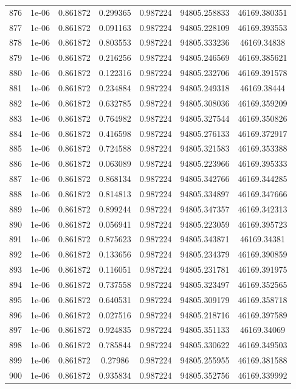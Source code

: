 \begin{table}
\begin{tabular*}{\linewidth}{c|c|c|c|c|c|c}
876 & 1e-06 & 0.861872 & 0.299365 & 0.987224 & 94805.258833 & 46169.380351\\
877 & 1e-06 & 0.861872 & 0.091163 & 0.987224 & 94805.228109 & 46169.393553\\
878 & 1e-06 & 0.861872 & 0.803553 & 0.987224 & 94805.333236 & 46169.34838\\
879 & 1e-06 & 0.861872 & 0.216256 & 0.987224 & 94805.246569 & 46169.385621\\
880 & 1e-06 & 0.861872 & 0.122316 & 0.987224 & 94805.232706 & 46169.391578\\
881 & 1e-06 & 0.861872 & 0.234884 & 0.987224 & 94805.249318 & 46169.38444\\
882 & 1e-06 & 0.861872 & 0.632785 & 0.987224 & 94805.308036 & 46169.359209\\
883 & 1e-06 & 0.861872 & 0.764982 & 0.987224 & 94805.327544 & 46169.350826\\
884 & 1e-06 & 0.861872 & 0.416598 & 0.987224 & 94805.276133 & 46169.372917\\
885 & 1e-06 & 0.861872 & 0.724588 & 0.987224 & 94805.321583 & 46169.353388\\
886 & 1e-06 & 0.861872 & 0.063089 & 0.987224 & 94805.223966 & 46169.395333\\
887 & 1e-06 & 0.861872 & 0.868134 & 0.987224 & 94805.342766 & 46169.344285\\
888 & 1e-06 & 0.861872 & 0.814813 & 0.987224 & 94805.334897 & 46169.347666\\
889 & 1e-06 & 0.861872 & 0.899244 & 0.987224 & 94805.347357 & 46169.342313\\
890 & 1e-06 & 0.861872 & 0.056941 & 0.987224 & 94805.223059 & 46169.395723\\
891 & 1e-06 & 0.861872 & 0.875623 & 0.987224 & 94805.343871 & 46169.34381\\
892 & 1e-06 & 0.861872 & 0.133656 & 0.987224 & 94805.234379 & 46169.390859\\
893 & 1e-06 & 0.861872 & 0.116051 & 0.987224 & 94805.231781 & 46169.391975\\
894 & 1e-06 & 0.861872 & 0.737558 & 0.987224 & 94805.323497 & 46169.352565\\
895 & 1e-06 & 0.861872 & 0.640531 & 0.987224 & 94805.309179 & 46169.358718\\
896 & 1e-06 & 0.861872 & 0.027516 & 0.987224 & 94805.218716 & 46169.397589\\
897 & 1e-06 & 0.861872 & 0.924835 & 0.987224 & 94805.351133 & 46169.34069\\
898 & 1e-06 & 0.861872 & 0.785844 & 0.987224 & 94805.330622 & 46169.349503\\
899 & 1e-06 & 0.861872 & 0.27986 & 0.987224 & 94805.255955 & 46169.381588\\
900 & 1e-06 & 0.861872 & 0.935834 & 0.987224 & 94805.352756 & 46169.339992\\
\end{tabular*}
\end{table}
